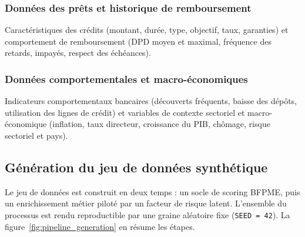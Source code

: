 \documentclass[a4paper,12pt,oneside]{report}
\begin{document}
\subsubsection{Données des prêts et historique de remboursement}

Caractéristiques des crédits (montant, durée, type, objectif, taux, garanties) et comportement
de remboursement (DPD moyen et maximal, fréquence des retards, impayés, respect des échéances).

\subsubsection{Données comportementales et macro-économiques}

Indicateurs comportementaux bancaires (découverts fréquents, baisse des dépôts, utilisation des
lignes de crédit) et variables de contexte sectoriel et macro-économique (inflation, taux
directeur, croissance du PIB, chômage, risque sectoriel et pays).

\subsection{Génération du jeu de données synthétique}

Le jeu de données est construit en deux temps : un socle de scoring BFPME, puis un
enrichissement métier piloté par un facteur de risque latent. L'ensemble du processus
est rendu reproductible par une graine aléatoire fixe (\texttt{SEED~=~42}). La
figure~\ref{fig:pipeline_generation} en résume les étapes.
\end{document}
